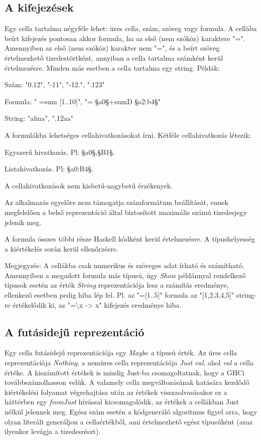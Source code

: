 \subsection{A kifejezések}

Egy cella tartalma négyféle lehet: üres cella, szám, szöveg vagy formula. A cellába beírt kifejezés pontosan akkor formula, ha az első (nem szóköz) karaktere "=". Amennyiben az első (nem szóköz) karakter nem "=", és a beírt szöveg értelmezhető tizedestörtként, annyiban a cella tartalma számként kerül értelmezésre. Minden más esetben a cella tartalma egy string. Példák:
\begin{compactenum}
	\item Szám: "0.12", "-11", "-12.", ".123"
	\item Formula: " =sum [1..10]", "= §a0§+sumD §a2:b4§"
	\item String: "alma", ".12aa"
\end{compactenum}

A formulákba lehetséges cellahivatkozásokat írni. Kétféle cellahivatkozás létezik:
\begin{compactenum}
	\item Egyszerű hivatkozás. Pl: §a0§,§B1§.
	\item Listahivatkozás. Pl: §a0:B4§.
\end{compactenum}

A cellahivatkozások nem kisbetű-nagybetű érzékenyek.

Az alkalmazás egyelőre nem támogatja számformátum beállítását, ennek megfelelően a belső reprezentáció által biztosított maximális számú tizedesjegy jelenik meg.

A formula összes többi része Haskell kódként kerül értelmezésre. A típushelyesség a kiértékelés során kerül ellenőrzésre.

Megjegyzés: A cellákba csak numerikus és szöveges adat írható és számítható. Amennyiben a megadott formula más típusú, úgy \textit{Show} példánnyal rendelkező típusok esetén az érték \textit{String} reprezentációja lesz a számítás eredménye, ellenkező esetben pedig hiba lép fel. Pl. az "=[1..5]" formula az "[1,2,3,4,5]" string-re értékelődik ki, az "=\textbackslash x -> x" kifejezés eredménye hiba.

\subsection{A futásidejű reprezentáció}

Egy cella futásidejű reprezentációja egy \textit{Maybe a} típusú érték. Az üres cella reprezentációja \textit{Nothing}, a nemüres cella reprezentációja \textit{Just val}, ahol \textit{val} a cella értéke. A kiszámított értékek is mindig Just-ba csomagoltatnak, hogy a GHCi továbbszámolhasson velük. A valamely cella megváltozásának hatására kezdődő kiértékelési folyamat végrehajtása után az értékek visszaolvasásakor ez a háttérben egy \textit{fromJust} hívással kicsomagolódik, az értékek a cellákban Just nélkül jelennek meg.
Egész szám esetén a kódgeneráló algoritmus figyel arra, hogy olyan literált generáljon a cellaértékből, ami értelmezhető egész típusúként (azaz ilyenkor levágja a tizedesrészt).

